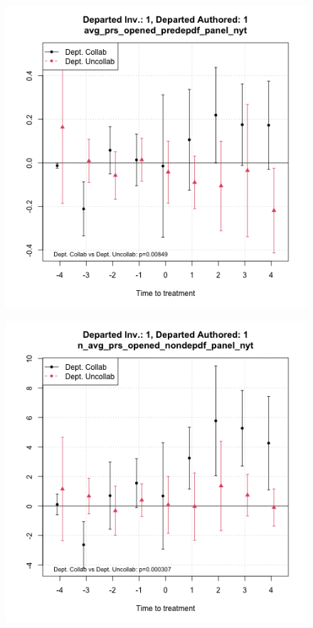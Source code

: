 \begin{figure}[htbp]
\begin{minipage}[b]{0.49\textwidth}
    \end{minipage}
    \hfill
    \begin{minipage}[b]{0.49\textwidth}
        \centering
        \includegraphics[width=\textwidth]{temp/output/collab_imp/auth1_inv1_cs_norm_avg_prs_opened_predep.png}
    \label{fig:avg_prs_opened_predep}
    \end{minipage}
    \hfill
    \begin{minipage}[b]{0.49\textwidth}
        \centering
        \includegraphics[width=\textwidth]{temp/output/collab_imp/auth1_inv1_cs_norm_n_avg_prs_opened_nondep.png}

\end{minipage}
\end{figure}
